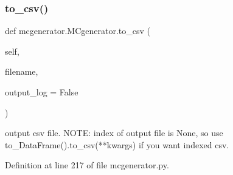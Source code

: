 \subsubsection{\texorpdfstring{to\+\_\+csv()}{to\_csv()}}
{\footnotesize\ttfamily def mcgenerator.\+M\+Cgenerator.\+to\+\_\+csv (\begin{DoxyParamCaption}\item[{}]{self,  }\item[{}]{filename,  }\item[{}]{output\+\_\+log = {\ttfamily False} }\end{DoxyParamCaption})}

\begin{DoxyVerb}output csv file.
NOTE: index of output file is None, so use to_DataFrame().to_csv(**kwargs) if you want indexed csv.
\end{DoxyVerb}
 

Definition at line 217 of file mcgenerator.\+py.


